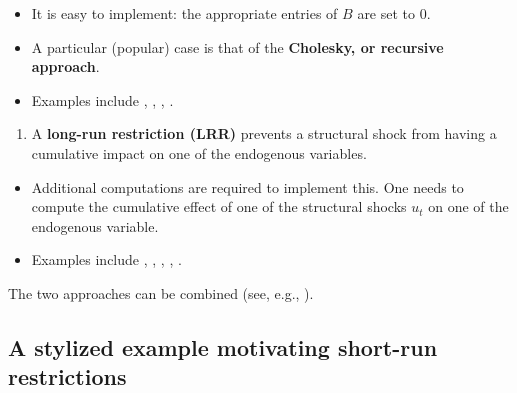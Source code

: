 \documentclass[
  12pt,
]{book}
\providecommand{\tightlist}{%
  \setlength{\itemsep}{0pt}\setlength{\parskip}{0pt}}
\theoremstyle{definition}
\theoremstyle{definition}
\theoremstyle{definition}
\theoremstyle{definition}
\theoremstyle{remark}
\begin{document}
\begin{itemize}
\tightlist
\item
  It is easy to implement: the appropriate entries of \(B\) are set to 0.
\item
  A particular (popular) case is that of the \textbf{Cholesky, or recursive approach}.
\item
  Examples include \citet{BERNANKE198649}, \citet{Sims_1986}, \citet{Gali_1992}, \citet{RubioRamirez_et_al_2010}.
\end{itemize}

\begin{enumerate}
\def\labelenumi{\arabic{enumi}.}
\setcounter{enumi}{1}
\tightlist
\item
  A \textbf{long-run restriction (LRR)} prevents a structural shock from having a cumulative impact on one of the endogenous variables.
\end{enumerate}

\begin{itemize}
\tightlist
\item
  Additional computations are required to implement this. One needs to compute the cumulative effect of one of the structural shocks \(u_{t}\) on one of the endogenous variable.
\item
  Examples include \citet{Blanchard_Quah_1989}, \citet{Faust_Leeper_1997}, \citet{Gali_1999}, \citet{Erceg_et_al_2005}, \citet{NBERc11177}.
\end{itemize}

The two approaches can be combined (see, e.g., \citet{Gerlach_Smets_1995}).

\hypertarget{a-stylized-example-motivating-short-run-restrictions}{%
\subsection{A stylized example motivating short-run restrictions}\label{a-stylized-example-motivating-short-run-restrictions}}
\end{document}
